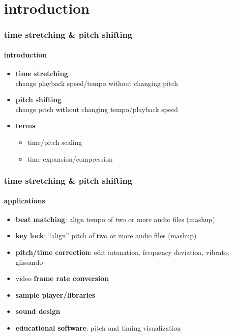 



\subtitle{Part 22: Time-stretching and Pitch-shifting}


	

\section[intro]{introduction}
\begin{frame}\frametitle{time stretching \& pitch shifting}\framesubtitle{introduction}
	\begin{itemize}
		\item	\textbf{time stretching}\\
			change playback speed/tempo without changing pitch
		\pause
        \bigskip
		\item	\textbf{pitch shifting}\\
			change pitch without changing tempo/playback speed
		\pause
        \bigskip
		\item	\textbf{terms}
            \begin{itemize}
                \item   time/pitch scaling
                \item   time expansion/compression
            \end{itemize}
	\end{itemize}

\end{frame}

\begin{frame}\frametitle{time stretching \& pitch shifting}\framesubtitle{applications}
	\begin{itemize}
		\item	\textbf{beat matching}: align tempo of two or more audio files (mashup)
		\pause
        \smallskip
		\item	\textbf{key lock}: ``align'' pitch of two or more audio files (mashup)
		\pause
        \smallskip
		\item	\textbf{pitch/time correction}: edit intonation, frequency deviation, vibrato, glissando
		\pause
        \smallskip
		\item	video \textbf{frame rate conversion}
		\pause
        \smallskip
		\item	\textbf{sample player/libraries}
		\pause
        \smallskip
		\item	\textbf{sound design}
		\pause
        \smallskip
		\item	\textbf{educational software}: pitch and timing visualization
	\end{itemize}
\end{frame}


